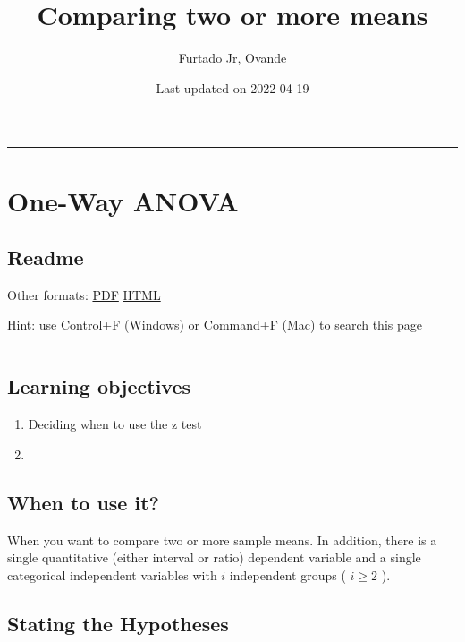 \documentclass[
]{article}
\title{Comparing two or more means}
\author{\href{http://drfurtado.us}{Furtado Jr, Ovande}}
\date{Last updated on 2022-04-19}
\providecommand{\tightlist}{%
  \setlength{\itemsep}{0pt}\setlength{\parskip}{0pt}}
\begin{document}
\maketitle

{
\setcounter{tocdepth}{2}
\tableofcontents
}
\begin{center}\rule{0.5\linewidth}{0.5pt}\end{center}

\hypertarget{one-way-anova}{%
\section{One-Way ANOVA}\label{one-way-anova}}

\hypertarget{readme}{%
\subsection{Readme}\label{readme}}

Other formats: \href{z-test.pdf}{PDF} \textbar{} \href{z-test.html}{HTML}

Hint: use Control+F (Windows) or Command+F (Mac) to search this page

\begin{center}\rule{0.5\linewidth}{0.5pt}\end{center}

\hypertarget{learning-objectives}{%
\subsection{Learning objectives}\label{learning-objectives}}

\begin{enumerate}
\def\labelenumi{\arabic{enumi}.}
\tightlist
\item
  Deciding when to use the z test
\item
\end{enumerate}

\hypertarget{when-to-use-it}{%
\subsection{When to use it?}\label{when-to-use-it}}

When you want to compare two or more sample means. In addition, there is a single quantitative (either interval or ratio) dependent variable and a single categorical independent variables with \(i\) independent groups ( \(i\geq 2\) ).

\hypertarget{stating-the-hypotheses}{%
\subsection{Stating the Hypotheses}\label{stating-the-hypotheses}}
\end{document}
